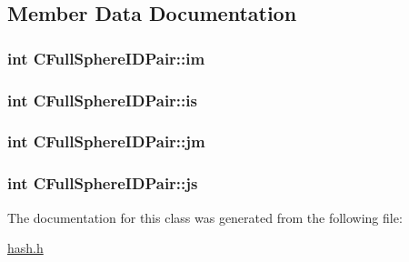 \subsection{Member Data Documentation}
\hypertarget{classCFullSphereIDPair_a60629b97e6033458a0f053553e420a33}{
\subsubsection[{im}]{\setlength{\rightskip}{0pt plus 5cm}int C\-Full\-Sphere\-I\-D\-Pair\-::im}}\label{classCFullSphereIDPair_a60629b97e6033458a0f053553e420a33}
\hypertarget{classCFullSphereIDPair_a8a6a419f8b195dad9eaf0efdef334160}{
\subsubsection[{is}]{\setlength{\rightskip}{0pt plus 5cm}int C\-Full\-Sphere\-I\-D\-Pair\-::is}}\label{classCFullSphereIDPair_a8a6a419f8b195dad9eaf0efdef334160}
\hypertarget{classCFullSphereIDPair_a8d5d6e6632c185395142b1c0e9775f4b}{
\subsubsection[{jm}]{\setlength{\rightskip}{0pt plus 5cm}int C\-Full\-Sphere\-I\-D\-Pair\-::jm}}\label{classCFullSphereIDPair_a8d5d6e6632c185395142b1c0e9775f4b}
\hypertarget{classCFullSphereIDPair_a5cf4df87753da2163a40a0bb08d50bd4}{
\subsubsection[{js}]{\setlength{\rightskip}{0pt plus 5cm}int C\-Full\-Sphere\-I\-D\-Pair\-::js}}\label{classCFullSphereIDPair_a5cf4df87753da2163a40a0bb08d50bd4}


The documentation for this class was generated from the following file\-:\begin{DoxyCompactItemize}
\item 
\hyperlink{hash_8h}{hash.\-h}\end{DoxyCompactItemize}
